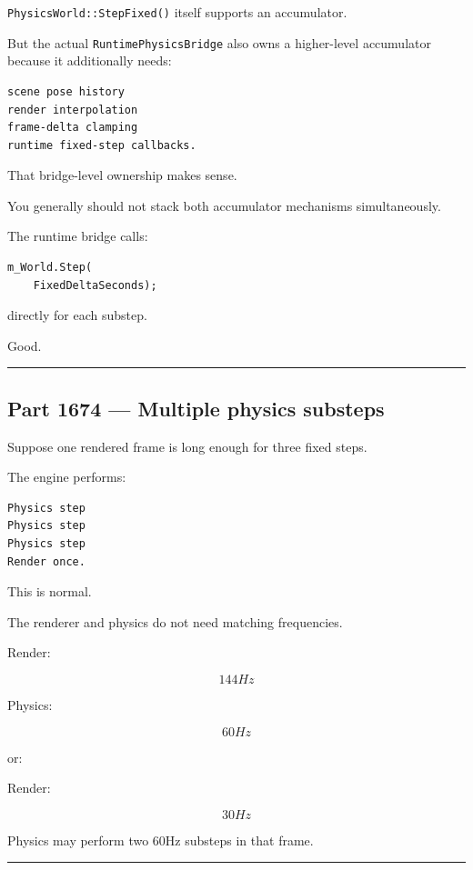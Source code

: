 \texttt{PhysicsWorld::StepFixed()} itself supports an accumulator.

But the actual \texttt{RuntimePhysicsBridge} also owns a higher-level accumulator because it additionally needs:

\begin{verbatim}
scene pose history
render interpolation
frame-delta clamping
runtime fixed-step callbacks.
\end{verbatim}

That bridge-level ownership makes sense.

You generally should not stack both accumulator mechanisms simultaneously.

The runtime bridge calls:

\begin{verbatim}
m_World.Step(
    FixedDeltaSeconds);
\end{verbatim}

directly for each substep.

Good.

\begin{center}\rule{0.5\linewidth}{0.5pt}\end{center}

\subsection{Part 1674 --- Multiple physics substeps}\label{06-engine-ii-ch037-part-1674-multiple-physics-substeps}

Suppose one rendered frame is long enough for three fixed steps.

The engine performs:

\begin{verbatim}
Physics step
Physics step
Physics step
Render once.
\end{verbatim}

This is normal.

The renderer and physics do not need matching frequencies.

Render:

\[
144Hz
\]

Physics:

\[
60Hz
\]

or:

Render:

\[
30Hz
\]

Physics may perform two 60Hz substeps in that frame.

\begin{center}\rule{0.5\linewidth}{0.5pt}\end{center}

